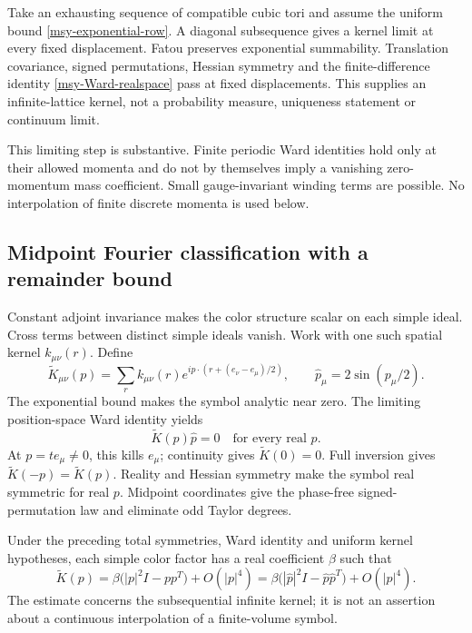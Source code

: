 Take an exhausting sequence of compatible cubic tori and
assume the uniform bound \eqref{msy-exponential-row}.
A diagonal subsequence gives a kernel limit at every fixed
displacement. Fatou preserves exponential summability.
Translation covariance, signed permutations, Hessian symmetry
and the finite-difference identity \eqref{msy-Ward-realspace}
pass at fixed displacements. This supplies an infinite-lattice
kernel, not a probability measure, uniqueness statement or
continuum limit.

This limiting step is substantive. Finite periodic Ward
identities hold only at their allowed momenta and do not
by themselves imply a vanishing zero-momentum mass
coefficient. Small gauge-invariant winding terms are possible.
No interpolation of finite discrete momenta is used below.

\subsection{Midpoint Fourier classification with a remainder bound}
\label{msy-classification-section}

Constant adjoint invariance makes the color structure scalar
on each simple ideal. Cross terms between distinct simple
ideals vanish. Work with one such spatial kernel
\(k_{\mu\nu}(r)\). Define
\begin{equation}
 \widetilde K_{\mu\nu}(p)=
 \sum_r k_{\mu\nu}(r)
       e^{ip\cdot(r+(e_\nu-e_\mu)/2)},\qquad
 \widehat p_\mu=2\sin(p_\mu/2).
 \label{msy-midpoint}
\end{equation}
The exponential bound makes the symbol analytic near zero.
The limiting position-space Ward identity yields
\begin{equation}
 \widetilde K(p)\widehat p=0
       \quad\text{for every real }p.
 \label{msy-Ward-symbol}
\end{equation}
At \(p=te_\mu\ne0\), this kills \(e_\mu\); continuity gives
\(\widetilde K(0)=0\). Full inversion gives
\(\widetilde K(-p)=\widetilde K(p)\). Reality and Hessian
symmetry make the symbol real symmetric for real \(p\).
Midpoint coordinates give the phase-free signed-permutation
law and eliminate odd Taylor degrees.

\begin{theorem}
\label{msy-Maxwell-theorem}
Under the preceding total symmetries, Ward identity and
uniform kernel hypotheses, each simple color factor has
a real coefficient \(\beta\) such that
\begin{equation}
 \widetilde K(p)
 =\beta\bigl(|p|^2I-pp^T\bigr)+O(|p|^4)
 =\beta\bigl(|\widehat p|^2I-
                      \widehat p\widehat p^T\bigr)+O(|p|^4).
 \label{msy-Maxwell-expansion}
\end{equation}
The estimate concerns the subsequential infinite kernel;
it is not an assertion about a continuous interpolation
of a finite-volume symbol.
\end{theorem}

